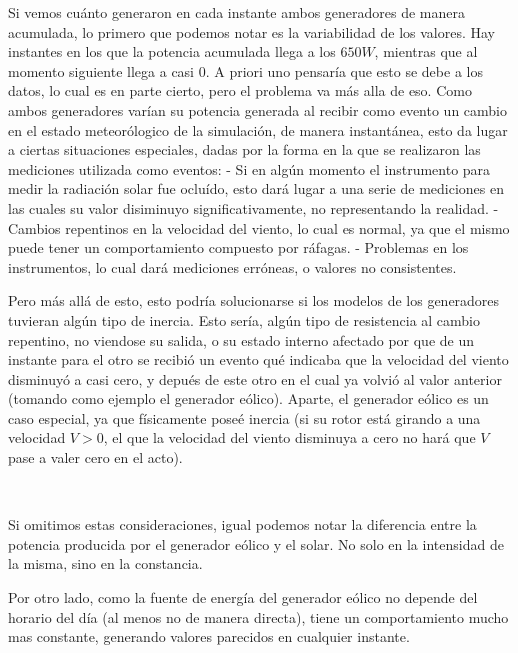     Si vemos cuánto generaron en cada instante ambos generadores de manera
acumulada, lo primero que podemos notar es la variabilidad de los
valores. Hay instantes en los que la potencia acumulada llega a los
\(650W\), mientras que al momento siguiente llega a casi 0. A priori uno
pensaría que esto se debe a los datos, lo cual es en parte cierto, pero
el problema va más alla de eso. Como ambos generadores varían su
potencia generada al recibir como evento un cambio en el estado
meteorólogico de la simulación, de manera instantánea, esto da lugar a
ciertas situaciones especiales, dadas por la forma en la que se
realizaron las mediciones utilizada como eventos: - Si en algún momento
el instrumento para medir la radiación solar fue ocluído, esto dará
lugar a una serie de mediciones en las cuales su valor disiminuyo
significativamente, no representando la realidad. - Cambios repentinos
en la velocidad del viento, lo cual es normal, ya que el mismo puede
tener un comportamiento compuesto por ráfagas. - Problemas en los
instrumentos, lo cual dará mediciones erróneas, o valores no
consistentes.

Pero más allá de esto, esto podría solucionarse si los modelos de los
generadores tuvieran algún tipo de inercia. Esto sería, algún tipo de
resistencia al cambio repentino, no viendose su salida, o su estado
interno afectado por que de un instante para el otro se recibió un
evento qué indicaba que la velocidad del viento disminuyó a casi cero, y
depués de este otro en el cual ya volvió al valor anterior (tomando como
ejemplo el generador eólico). Aparte, el generador eólico es un caso
especial, ya que físicamente poseé inercia (si su rotor está girando a
una velocidad \(V > 0\), el que la velocidad del viento disminuya a cero
no hará que \(V\) pase a valer cero en el acto).

    \begin{center}
    \end{center}
    { \hspace*{\fill} \\}

    Si omitimos estas consideraciones, igual podemos notar la diferencia
entre la potencia producida por el generador eólico y el solar. No solo
en la intensidad de la misma, sino en la constancia.

Por otro lado, como la fuente de energía del generador eólico no depende
del horario del día (al menos no de manera directa), tiene un
comportamiento mucho mas constante, generando valores parecidos en
cualquier instante.


